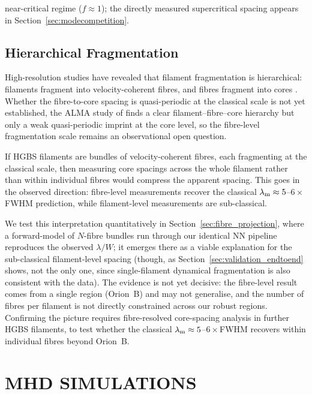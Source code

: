 \documentclass[usenatbib,twoside,twocolumn]{mnras}
\begin{document}
near-critical regime ($f\approx1$); the directly measured supercritical spacing appears in Section~\ref{sec:modecompetition}.

\subsection{Hierarchical Fragmentation}

High-resolution studies have revealed that filament fragmentation is hierarchical: filaments fragment into velocity-coherent fibres, and fibres fragment into cores \citep{Hacar2013,Hacar2018,Yang2024}. Whether the fibre-to-core spacing is quasi-periodic at the classical scale is not yet established, the ALMA study of \citet{Yang2024} finds a clear filament--fibre--core hierarchy but only a weak quasi-periodic imprint at the core level, so the fibre-level fragmentation scale remains an observational open question.

If HGBS filaments are bundles of velocity-coherent fibres, each fragmenting at the classical scale, then measuring core spacings across the whole filament rather than within individual fibres would compress the apparent spacing. This goes in the observed direction: fibre-level measurements recover the classical $\lambda_{\rm m}\approx5$--$6\times$FWHM prediction, while filament-level measurements are sub-classical.

We test this interpretation quantitatively in Section~\ref{sec:fibre_projection}, where a forward-model of $N$-fibre bundles run through our identical NN pipeline reproduces the observed $\lambda/W$; it emerges there as a viable explanation for the sub-classical filament-level spacing (though, as Section~\ref{sec:validation_endtoend} shows, not the only one, since single-filament dynamical fragmentation is also consistent with the data). The evidence is not yet decisive: the \citet{Yang2024} fibre-level result comes from a single region (Orion~B) and may not generalise, and the number of fibres per filament is not directly constrained across our robust regions. Confirming the picture requires fibre-resolved core-spacing analysis in further HGBS filaments, to test whether the classical $\lambda_{\rm m}\approx5$--$6\times$FWHM recovers within individual fibres beyond Orion~B.

\section{MHD SIMULATIONS}
\end{document}
